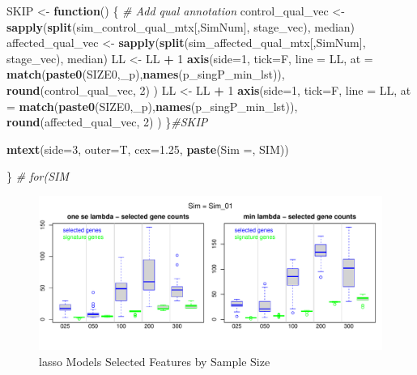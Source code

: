 \documentclass[
]{book}
\newenvironment{Shaded}{\begin{snugshade}}{\end{snugshade}}
\newcommand{\CommentTok}[1]{\textcolor[rgb]{0.56,0.35,0.01}{\textit{#1}}}
\newcommand{\ControlFlowTok}[1]{\textcolor[rgb]{0.13,0.29,0.53}{\textbf{#1}}}
\newcommand{\DataTypeTok}[1]{\textcolor[rgb]{0.13,0.29,0.53}{#1}}
\newcommand{\DecValTok}[1]{\textcolor[rgb]{0.00,0.00,0.81}{#1}}
\newcommand{\FloatTok}[1]{\textcolor[rgb]{0.00,0.00,0.81}{#1}}
\newcommand{\KeywordTok}[1]{\textcolor[rgb]{0.13,0.29,0.53}{\textbf{#1}}}
\newcommand{\NormalTok}[1]{#1}
\newcommand{\OperatorTok}[1]{\textcolor[rgb]{0.81,0.36,0.00}{\textbf{#1}}}
\newcommand{\StringTok}[1]{\textcolor[rgb]{0.31,0.60,0.02}{#1}}
\begin{document}
\begin{Shaded}
\begin{Highlighting}[]
\NormalTok{SKIP  <{-}}\StringTok{ }\ControlFlowTok{function}\NormalTok{() \{}
\CommentTok{\# Add qual annotation}
\NormalTok{control\_qual\_vec <{-}}\StringTok{ }\KeywordTok{sapply}\NormalTok{(}\KeywordTok{split}\NormalTok{(sim\_control\_qual\_mtx[,SimNum], stage\_vec), median)}
\NormalTok{affected\_qual\_vec <{-}}\StringTok{ }\KeywordTok{sapply}\NormalTok{(}\KeywordTok{split}\NormalTok{(sim\_affected\_qual\_mtx[,SimNum], stage\_vec), median)}
\NormalTok{LL <{-}}\StringTok{ }\NormalTok{LL }\OperatorTok{+}\StringTok{ }\DecValTok{1}
\KeywordTok{axis}\NormalTok{(}\DataTypeTok{side=}\DecValTok{1}\NormalTok{, }\DataTypeTok{tick=}\NormalTok{F, }\DataTypeTok{line =}\NormalTok{ LL,}
  \DataTypeTok{at =}  \KeywordTok{match}\NormalTok{(}\KeywordTok{paste0}\NormalTok{(SIZE0,}\StringTok{\textquotesingle{}\_p\textquotesingle{}}\NormalTok{),}\KeywordTok{names}\NormalTok{(p\_singP\_min\_lst)),}
  \KeywordTok{round}\NormalTok{(control\_qual\_vec, }\DecValTok{2}\NormalTok{)}
\NormalTok{ )}
\NormalTok{LL <{-}}\StringTok{ }\NormalTok{LL }\OperatorTok{+}\StringTok{ }\DecValTok{1}
\KeywordTok{axis}\NormalTok{(}\DataTypeTok{side=}\DecValTok{1}\NormalTok{, }\DataTypeTok{tick=}\NormalTok{F, }\DataTypeTok{line =}\NormalTok{ LL,}
  \DataTypeTok{at =}  \KeywordTok{match}\NormalTok{(}\KeywordTok{paste0}\NormalTok{(SIZE0,}\StringTok{\textquotesingle{}\_p\textquotesingle{}}\NormalTok{),}\KeywordTok{names}\NormalTok{(p\_singP\_min\_lst)),}
  \KeywordTok{round}\NormalTok{(affected\_qual\_vec, }\DecValTok{2}\NormalTok{)}
\NormalTok{ )}
\NormalTok{\}}\CommentTok{\#SKIP}

\KeywordTok{mtext}\NormalTok{(}\DataTypeTok{side=}\DecValTok{3}\NormalTok{, }\DataTypeTok{outer=}\NormalTok{T, }\DataTypeTok{cex=}\FloatTok{1.25}\NormalTok{, }\KeywordTok{paste}\NormalTok{(}\StringTok{\textquotesingle{}Sim =\textquotesingle{}}\NormalTok{,  SIM))}

\NormalTok{\} }\CommentTok{\# for(SIM}
\end{Highlighting}
\end{Shaded}

\begin{figure}
\centering
\includegraphics{Static/figures/hcc5hmC-glmnetSuite-lasso-simRes-features-bySim-1.pdf}
\caption{\label{fig:hcc5hmC-glmnetSuite-lasso-simRes-features-bySim}lasso Models Selected Features by Sample Size}
\end{figure}
\end{document}
